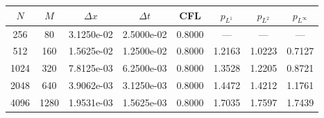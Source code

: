 \begin{tabular}{cccccccc}
\toprule
$N$ & $M$ & $\Delta x$ & $\Delta t$ & CFL & $p_{L^1}$ & $p_{L^2}$ & $p_{L^\infty}$ \\
\midrule
256 & 80 & 3.1250e-02 & 2.5000e-02 & 0.8000 & --- & --- & --- \\
512 & 160 & 1.5625e-02 & 1.2500e-02 & 0.8000 & 1.2163 & 1.0223 & 0.7127 \\
1024 & 320 & 7.8125e-03 & 6.2500e-03 & 0.8000 & 1.3528 & 1.2205 & 0.8721 \\
2048 & 640 & 3.9062e-03 & 3.1250e-03 & 0.8000 & 1.4472 & 1.4212 & 1.1761 \\
4096 & 1280 & 1.9531e-03 & 1.5625e-03 & 0.8000 & 1.7035 & 1.7597 & 1.7439 \\
\bottomrule
\end{tabular}